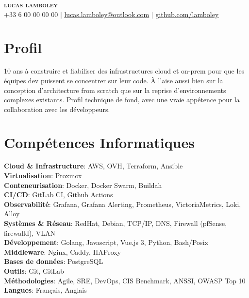 \documentclass[letterpaper,11pt]{article}
\begin{document}
  \begin{center}
    \textbf{\Huge \scshape lucas lamboley} \\ \vspace{1pt}
    \small +33 6 00 00 00 00 $|$
    \href{mailto:lucas.lamboley@outlook.com}{\underline{lucas.lamboley@outlook.com}} $|$
    \href{https://github.com/lamboley}{\underline{github.com/lamboley}}
  \end{center}

  \section{Profil}
  \begin{itemize}[leftmargin=0.15in, label={}]
    \small{\item{
      10 ans à construire et fiabiliser des infrastructures cloud et on-prem pour que les équipes dev
      puissent se concentrer sur leur code. À l'aise aussi bien sur la conception d'architecture from
      scratch que sur la reprise d'environnements complexes existants. Profil technique de fond,
      avec une vraie appétence pour la collaboration avec les développeurs.
    }}
  \end{itemize}

  \section{Compétences Informatiques}
  \begin{itemize}[leftmargin=0.15in, label={}]
    \small{\item{
      \textbf{Cloud \& Infrastructure}: AWS, OVH, Terraform, Ansible \\
      \textbf{Virtualisation}: Proxmox \\
      \textbf{Conteneurisation}: Docker, Docker Swarm, Buildah \\
      \textbf{CI/CD}: GitLab CI, Github Actions \\
      \textbf{Observabilité}: Grafana, Grafana Alerting, Prometheus, VictoriaMetrics, Loki, Alloy \\
      \textbf{Systèmes \& Réseau}: RedHat, Debian, TCP/IP, DNS, Firewall (pfSense, firewalld), VLAN \\
      \textbf{Développement}: Golang, Javascript, Vue.js 3, Python, Bash/Posix \\
      \textbf{Middleware}: Nginx, Caddy, HAProxy \\
      \textbf{Bases de données}: PostgreSQL \\
      \textbf{Outils}: Git, GitLab \\
      \textbf{Méthodologies}: Agile, SRE, DevOps, CIS Benchmark, ANSSI, OWASP Top 10 \\
      \textbf{Langues}: Français, Anglais
    }}
  \end{itemize}
\end{document}
